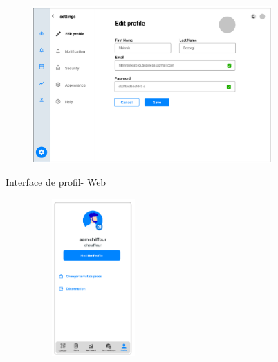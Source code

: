 \begin{figure}[h!]
  \centering
  \begin{minipage}[t]{0.60\textwidth}
    \centering
    \includegraphics[width=1\textwidth, height=6cm]{chap2.images/prot modifer web.png}
    \caption{Interface de profil- Web}
  \end{minipage}
  \hfill
  \begin{minipage}[t]{0.38\textwidth}
    \centering
    \includegraphics[width=0.6\textwidth, height=6cm]{chap2.images/prot modifier mob.png}
    \caption{}
  \end{minipage}
\end{figure}





